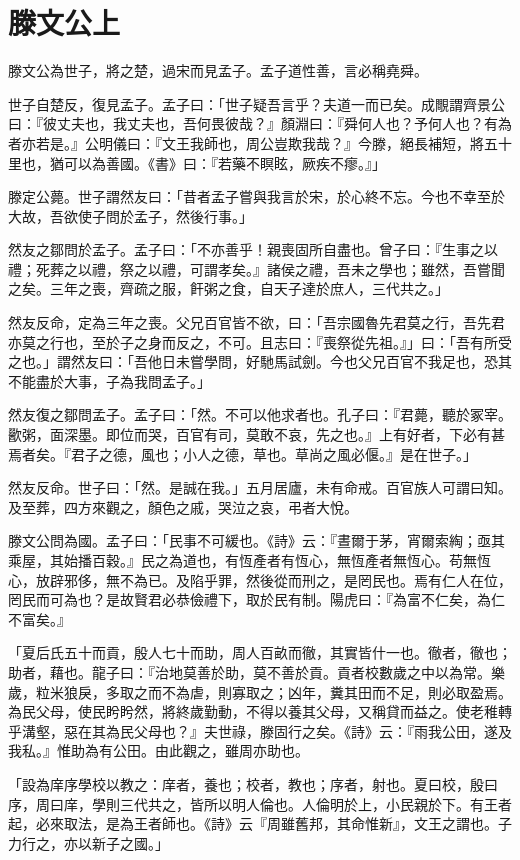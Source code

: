 \documentclass[12pt,a4paper]{ctexbook}
\begin{document}
\section{滕文公上}
滕文公為世子，將之楚，過宋而見孟子。孟子道性善，言必稱堯舜。\par
世子自楚反，復見孟子。孟子曰：「世子疑吾言乎？夫道一而已矣。成覸謂齊景公曰：『彼丈夫也，我丈夫也，吾何畏彼哉？』顏淵曰：『舜何人也？予何人也？有為者亦若是。』公明儀曰：『文王我師也，周公豈欺我哉？』今滕，絕長補短，將五十里也，猶可以為善國。《書》曰：『若藥不瞑眩，厥疾不瘳。』」\par
滕定公薨。世子謂然友曰：「昔者孟子嘗與我言於宋，於心終不忘。今也不幸至於大故，吾欲使子問於孟子，然後行事。」\par
然友之鄒問於孟子。孟子曰：「不亦善乎！親喪固所自盡也。曾子曰：『生事之以禮；死葬之以禮，祭之以禮，可謂孝矣。』諸侯之禮，吾未之學也；雖然，吾嘗聞之矣。三年之喪，齊疏之服，飦粥之食，自天子達於庶人，三代共之。」\par
然友反命，定為三年之喪。父兄百官皆不欲，曰：「吾宗國魯先君莫之行，吾先君亦莫之行也，至於子之身而反之，不可。且志曰：『喪祭從先祖。』」曰：「吾有所受之也。」謂然友曰：「吾他日未嘗學問，好馳馬試劍。今也父兄百官不我足也，恐其不能盡於大事，子為我問孟子。」\par
然友復之鄒問孟子。孟子曰：「然。不可以他求者也。孔子曰：『君薨，聽於冢宰。歠粥，面深墨。即位而哭，百官有司，莫敢不哀，先之也。』上有好者，下必有甚焉者矣。『君子之德，風也；小人之德，草也。草尚之風必偃。』是在世子。」\par
然友反命。世子曰：「然。是誠在我。」五月居廬，未有命戒。百官族人可謂曰知。及至葬，四方來觀之，顏色之戚，哭泣之哀，弔者大悅。\par
滕文公問為國。孟子曰：「民事不可緩也。《詩》云：『晝爾于茅，宵爾索綯；亟其乘屋，其始播百穀。』民之為道也，有恆產者有恆心，無恆產者無恆心。苟無恆心，放辟邪侈，無不為已。及陷乎罪，然後從而刑之，是罔民也。焉有仁人在位，罔民而可為也？是故賢君必恭儉禮下，取於民有制。陽虎曰：『為富不仁矣，為仁不富矣。』\par
「夏后氏五十而貢，殷人七十而助，周人百畝而徹，其實皆什一也。徹者，徹也；助者，藉也。龍子曰：『治地莫善於助，莫不善於貢。貢者校數歲之中以為常。樂歲，粒米狼戾，多取之而不為虐，則寡取之；凶年，糞其田而不足，則必取盈焉。為民父母，使民盻盻然，將終歲勤動，不得以養其父母，又稱貸而益之。使老稚轉乎溝壑，惡在其為民父母也？』夫世祿，滕固行之矣。《詩》云：『雨我公田，遂及我私。』惟助為有公田。由此觀之，雖周亦助也。\par
「設為庠序學校以教之：庠者，養也；校者，教也；序者，射也。夏曰校，殷曰序，周曰庠，學則三代共之，皆所以明人倫也。人倫明於上，小民親於下。有王者起，必來取法，是為王者師也。《詩》云『周雖舊邦，其命惟新』，文王之謂也。子力行之，亦以新子之國。」\par
\end{document}
